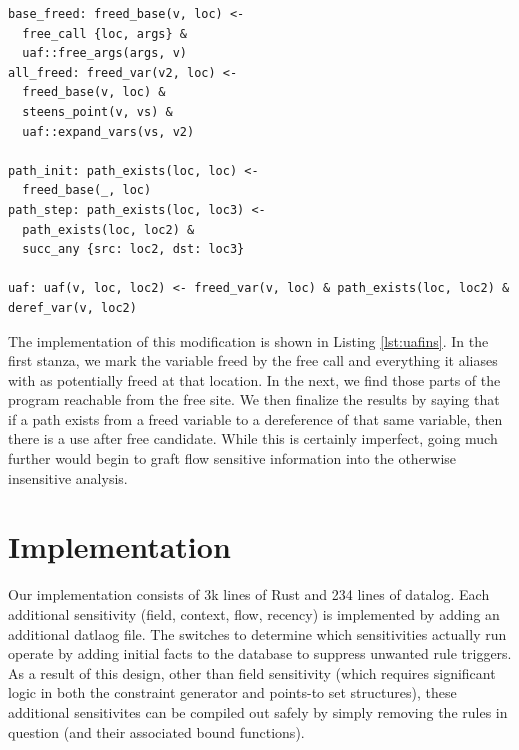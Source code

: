 \begin{lstlisting}[label=lst:uafins, caption={Tracking Frees Insensitively}]
base_freed: freed_base(v, loc) <-
  free_call {loc, args} &
  uaf::free_args(args, v)
all_freed: freed_var(v2, loc) <-
  freed_base(v, loc) &
  steens_point(v, vs) &
  uaf::expand_vars(vs, v2)

path_init: path_exists(loc, loc) <-
  freed_base(_, loc)
path_step: path_exists(loc, loc3) <-
  path_exists(loc, loc2) &
  succ_any {src: loc2, dst: loc3}

uaf: uaf(v, loc, loc2) <- freed_var(v, loc) & path_exists(loc, loc2) & deref_var(v, loc2)
\end{lstlisting}

The implementation of this modification is shown in Listing \ref{lst:uafins}.
In the first stanza, we mark the variable freed by the free call and everything it aliases with as potentially freed at that location.
In the next, we find those parts of the program reachable from the free site.
We then finalize the results by saying that if a path exists from a freed variable to a dereference of that same variable, then there is a use after free candidate.
While this is certainly imperfect, going much further would begin to graft flow sensitive information into the otherwise insensitive analysis.

\section{Implementation}
\label{alias:sec:impl}
Our implementation consists of 3k lines of Rust and 234 lines of datalog.
Each additional sensitivity (field, context, flow, recency) is implemented by adding an additional datlaog file.
The switches to determine which sensitivities actually run operate by adding initial facts to the database to suppress unwanted rule triggers.
As a result of this design, other than field sensitivity (which requires significant logic in both the constraint generator and points-to set structures), these additional sensitivites can be compiled out safely by simply removing the rules in question (and their associated bound functions).

